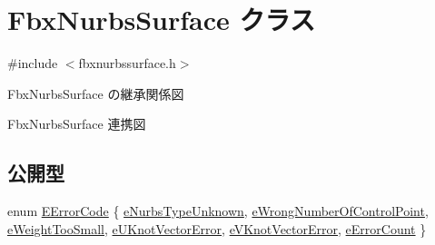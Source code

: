\hypertarget{class_fbx_nurbs_surface}{}\section{Fbx\+Nurbs\+Surface クラス}
\label{class_fbx_nurbs_surface}


{\ttfamily \#include $<$fbxnurbssurface.\+h$>$}



Fbx\+Nurbs\+Surface の継承関係図


Fbx\+Nurbs\+Surface 連携図
\subsection*{公開型}
\begin{DoxyCompactItemize}
\item 
enum \hyperlink{class_fbx_nurbs_surface_adadf65d5c2d4ecb11d0d084c7312106a}{E\+Error\+Code} \{ \newline
\hyperlink{class_fbx_nurbs_surface_adadf65d5c2d4ecb11d0d084c7312106aa4af927e784b47e879aeb1672a67594c5}{e\+Nurbs\+Type\+Unknown}, 
\hyperlink{class_fbx_nurbs_surface_adadf65d5c2d4ecb11d0d084c7312106aa79c07305f494a6d2e922d8dc56bc71af}{e\+Wrong\+Number\+Of\+Control\+Point}, 
\hyperlink{class_fbx_nurbs_surface_adadf65d5c2d4ecb11d0d084c7312106aa92e4b302bc53a2dcef4d27e9e4f3a272}{e\+Weight\+Too\+Small}, 
\hyperlink{class_fbx_nurbs_surface_adadf65d5c2d4ecb11d0d084c7312106aa5d18ce8baa2740bcaa391a98a7ffbd92}{e\+U\+Knot\+Vector\+Error}, 
\newline
\hyperlink{class_fbx_nurbs_surface_adadf65d5c2d4ecb11d0d084c7312106aa2dddd5da07320e0e7260829ce503abe6}{e\+V\+Knot\+Vector\+Error}, 
\hyperlink{class_fbx_nurbs_surface_adadf65d5c2d4ecb11d0d084c7312106aaeca9620353bd711c0f6c26c263304df5}{e\+Error\+Count}
 \}
\end{DoxyCompactItemize}
